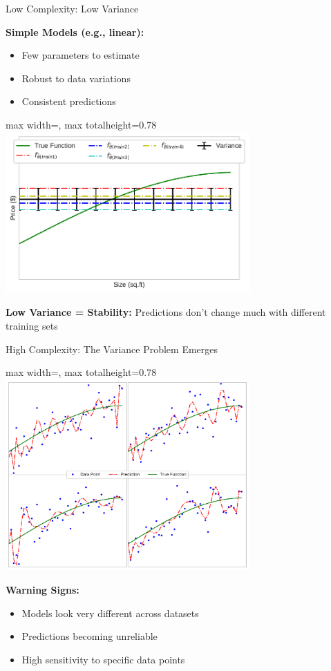 \documentclass[10pt]{beamer}
\newcommand{\fitpic}[1]{\begin{adjustbox}{max width=\linewidth, max totalheight=0.78\textheight}#1\end{adjustbox}}
\begin{document}
\begin{frame}{Low Complexity: Low Variance}
\begin{keypointsbox}
\textbf{Simple Models (e.g., linear):}
\begin{itemize}
\item Few parameters to estimate
\item Robust to data variations
\item Consistent predictions
\end{itemize}
\end{keypointsbox}

\begin{center}
\fitpic{\includegraphics[width=0.7\textwidth]{../assets/bias-variance/figures/var2.pdf}}
\end{center}

\begin{definitionbox}
\textbf{Low Variance = Stability:} Predictions don't change much with different training sets
\end{definitionbox}
\end{frame}

\begin{frame}{High Complexity: The Variance Problem Emerges}
\begin{center}
\fitpic{\includegraphics[width=0.7\textwidth]{../assets/bias-variance/figures/var3.pdf}}
\end{center}

\begin{alertbox}
\textbf{Warning Signs:} 
\begin{itemize}
\item Models look very different across datasets
\item Predictions becoming unreliable
\item High sensitivity to specific data points
\end{itemize}
\end{alertbox}
\end{frame}
\end{document}
